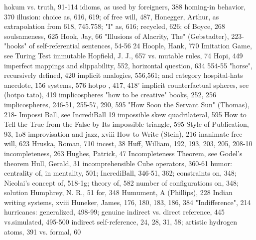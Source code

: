 hokum vs. truth, 91-114                             idioms, as used by foreigners, 388
homing-in behavior, 370                             illusion: choice as, 616, 619; of free will, 487,
Honegger, Arthur, as extrapolation from               618, 745.758; "I" as, 616; recycled, 626; of
  Boyce, 268                                          soulsameness, 625
Hook, Jay, 66                                       "Illusions of Alacrity, The" (Gebstadter), 223-
"hooks" of self-referential sentences, 54-56          24
Hoople, Hank, 770                                   Imitation Game, see Turing Test immutable
Hopfield, J. J., 657                                  vs. mutable rules, 74
Hopi, 449                                           imperfect mappings and slippability, 552,
horizontal question, 634                              554-55
"horse", recursively defined, 420                   implicit analogies, 556,561; and category
 hospital-hats anecdote, 156                          systems, 576
hotpo , 417, 418'                                   implicit counterfactual spheres, see
(hotpo tato), 419                                     implicospheres
"how to be creative" books, 252, 256                implicospheres, 246-51, 255-57, 290, 595
"How Soon the Servant Sun" (Thomas), 218-           Impossi Ball, see IncrediBall
  19                                                impossible skew quadrilateral, 595
How to Tell the True from the False by Its          impossible triangle, 595
  Style of Publication, 93, 1o8                     improvisation and jazz, xviii
How to Write (Stein), 216                           inanimate free will, 623
Hruska, Roman, 710                                  incest, 38
Huff, William, 192, 193, 203, 205, 208-10           incompleteness, 263
Hughes, Patrick, 47                                 Incompleteness Theorem, see Godel's theorem
Hull, Gerald, 31                                    incomprehensible Cube operators, 360-61
humor: centrality of, in mentality, 501;            IncrediBall, 346-51, 362; constraints on, 348;
  Nicolai's concept of, 518-1g; theory of, 582        number of configurations on, 348; solution
Humphrey, N. R., 51                                   for, 348
Humument, A (Phillips), 228                         Indian writing systems, xviii
Huneker, James, 176, 180, 183, 186, 384             "Indifference", 214
hurricanes: generalized, 498-99; genuine            indirect vs. direct reference, 445
  vs.simulated, 495-500                             indirect self-reference, 24, 28, 31, 58; artistic
hydrogen atoms, 391                                   vs. formal, 60

